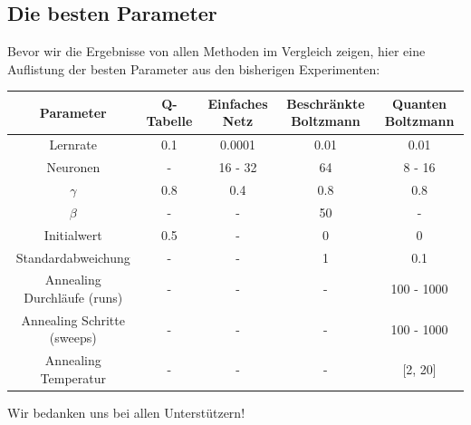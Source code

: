 \newpage

\subsection{Die besten Parameter}
\label{subsec:best}

Bevor wir die Ergebnisse von allen Methoden im Vergleich zeigen, hier eine Auflistung der besten Parameter aus den bisherigen Experimenten:

\begin{tabular}[H]{c|c|c|c|c}
Parameter 				& Q-Tabelle 	& Einfaches Netz 	& Beschränkte Boltzmann 	& Quanten Boltzmann  		\\
\hline
Lernrate 					& 0.1 		& 0.0001			& 0.01				& 0.01					\\
\hline
Neuronen 					& - 			& 16 - 32			& 64 					& 8 - 16					\\
\hline
$\gamma$ 				& 0.8			& 0.4				& 0.8					& 0.8						\\
\hline
$\beta$ 					& - 			& - 				& 50 					& - 						\\
\hline
Initialwert 					& 0.5 		& - 				& 0 					& 0						\\
\hline
Standardabweichung 			& - 			& - 				& 1 					& 0.1						\\
\hline
Annealing Durchläufe (runs)	& - 			& - 				& - 					& 100 - 1000				\\
\hline
Annealing Schritte (sweeps)	& - 			& - 				& - 					& 100 - 1000				\\
\hline
Annealing Temperatur		& - 			& - 				& - 					& [2, 20]					\\
\end{tabular}

\newpage



\begin{acknowledgement}
Wir bedanken uns bei allen Unterstützern!
\end{acknowledgement}
